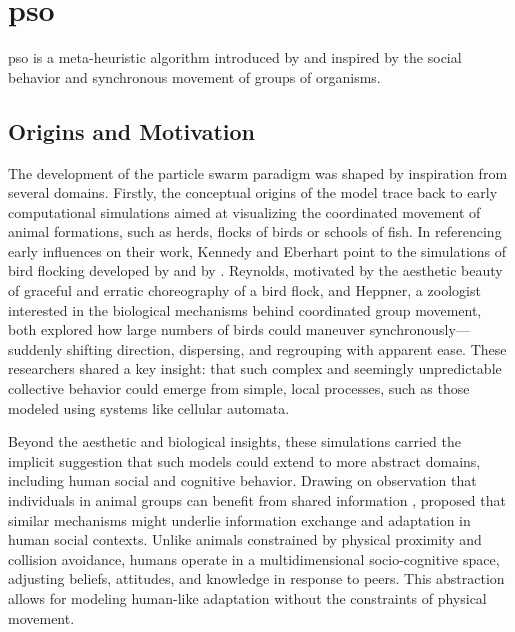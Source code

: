 \chapter[Particle Swarm Optimization (PSO)]{\acrfull{pso}}
\label{cp:introduction}

{


\nocite{eberhart1995new}
\acrfull{pso}
is 
a meta-heuristic  algorithm
introduced by \citet{kennedy1995particle} and inspired by the social behavior and synchronous movement of groups of organisms.

\section{%
Origins and Motivation}
The development of the particle swarm paradigm was shaped by inspiration from several domains.
Firstly,
the
conceptual
origins of the
model
trace back to early computational simulations aimed at visualizing the coordinated movement of animal formations, such as herds, flocks of birds or schools of fish.
In referencing early influences on their work, Kennedy and Eberhart point to the simulations of bird flocking developed by \citet{reynolds1987flocks} and by \citet{heppner1990stochastic}. Reynolds, motivated by the aesthetic beauty of 
graceful and erratic choreography of a bird flock,
and Heppner, a zoologist interested in the biological mechanisms behind coordinated group movement, both explored how large numbers of birds could maneuver synchronously---suddenly shifting direction, dispersing, and regrouping with apparent ease. These researchers shared a key insight: that such complex and seemingly unpredictable collective behavior could emerge from simple, local processes,
such as those modeled using systems like cellular automata.

Beyond the aesthetic and biological insights, these simulations carried the implicit suggestion that such models could extend to more abstract domains, including human social and cognitive behavior. Drawing on observation that individuals in animal groups can benefit from shared information \parencite{wilson1975sociobiology}, \citeauthor{kennedy1995particle} proposed that similar mechanisms might underlie information exchange and adaptation in human social contexts. Unlike animals constrained by physical proximity and collision avoidance, humans operate in a multidimensional socio-cognitive space, adjusting beliefs, attitudes, and knowledge in response to peers. This abstraction allows for modeling human-like adaptation without the constraints of physical movement.

}
